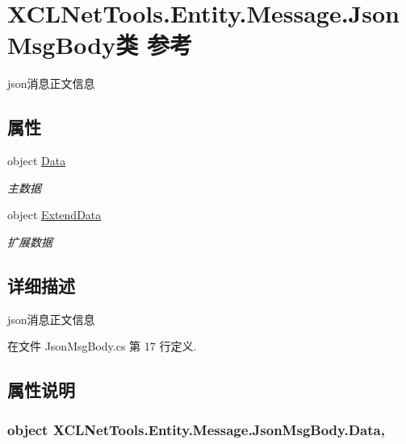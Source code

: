 \hypertarget{class_x_c_l_net_tools_1_1_entity_1_1_message_1_1_json_msg_body}{\section{X\-C\-L\-Net\-Tools.\-Entity.\-Message.\-Json\-Msg\-Body类 参考}
\label{class_x_c_l_net_tools_1_1_entity_1_1_message_1_1_json_msg_body}
}


json消息正文信息  


\subsection*{属性}
\begin{DoxyCompactItemize}
\item 
object \hyperlink{class_x_c_l_net_tools_1_1_entity_1_1_message_1_1_json_msg_body_a8bf6d68ba33b65eac5431b4d2873e719}{Data}
\begin{DoxyCompactList}\small\item\em 主数据 \end{DoxyCompactList}\item 
object \hyperlink{class_x_c_l_net_tools_1_1_entity_1_1_message_1_1_json_msg_body_a0382629d68979ea8a39383a1d9891ab7}{Extend\-Data}
\begin{DoxyCompactList}\small\item\em 扩展数据 \end{DoxyCompactList}\end{DoxyCompactItemize}


\subsection{详细描述}
json消息正文信息 



在文件 Json\-Msg\-Body.\-cs 第 17 行定义.



\subsection{属性说明}
\hypertarget{class_x_c_l_net_tools_1_1_entity_1_1_message_1_1_json_msg_body_a8bf6d68ba33b65eac5431b4d2873e719}{
\subsubsection[{Data}]{\setlength{\rightskip}{0pt plus 5cm}object X\-C\-L\-Net\-Tools.\-Entity.\-Message.\-Json\-Msg\-Body.\-Data\hspace{0.3cm}{\ttfamily [get]}, {\ttfamily [set]}}}\label{class_x_c_l_net_tools_1_1_entity_1_1_message_1_1_json_msg_body_a8bf6d68ba33b65eac5431b4d2873e719}


